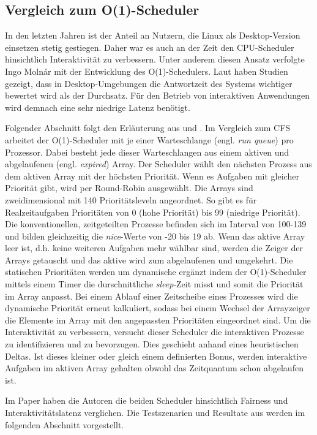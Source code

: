\subsection{Vergleich zum O(1)-Scheduler}\label{s:compO1}
In den letzten Jahren ist der Anteil an Nutzern, die Linux als Desktop-Version einsetzen stetig gestiegen. Daher war es auch an der Zeit den CPU-Scheduler hinsichtlich Interaktivität zu verbessern. Unter anderem diesen Ansatz verfolgte Ingo Molnár mit der Entwicklung des O(1)-Schedulers. Laut \cite{papercomparison} haben Studien gezeigt, dass in Desktop-Umgebungen die Antwortzeit des Systems wichtiger bewertet wird als der Durchsatz. Für den Betrieb von interaktiven Anwendungen wird demnach eine sehr niedrige Latenz benötigt. 

Folgender Abschnitt folgt den Erläuterung aus \cite{asilberschatz} und \cite{papercomparison}.
Im Vergleich zum CFS arbeitet der O(1)-Scheduler mit je einer Warteschlange (engl. \textit{run queue}) pro Prozessor. Dabei besteht jede dieser Warteschlangen aus einem aktiven und abgelaufenen (engl. \textit{expired}) Array. Der Scheduler wählt den nächsten Prozess aus dem aktiven Array mit der höchsten Priorität. Wenn es Aufgaben mit gleicher Priorität gibt, wird per Round-Robin ausgewählt. Die Arrays sind zweidimensional mit 140 Prioritätsleveln angeordnet. So gibt es für Realzeitaufgaben Prioritäten von 0 (hohe Priorität) bis 99 (niedrige Priorität). Die konventionellen, zeitgeteilten Prozesse befinden sich im Interval von 100-139 und bilden gleichzeitig die \textit{nice}-Werte von -20 bis 19 ab. Wenn das aktive Array leer ist, d.h. keine weiteren Aufgaben mehr wählbar sind, werden die Zeiger der Arrays getauscht und das aktive wird zum abgelaufenen und umgekehrt. Die statischen Prioritäten werden um dynamische ergänzt indem der O(1)-Scheduler mittels einem Timer die durschnittliche \textit{sleep}-Zeit misst und somit die Priorität im Array anpasst. Bei einem Ablauf einer Zeitscheibe eines Prozesses wird die dynamische Priorität erneut kalkuliert, sodass bei einem Wechsel der Arrayzeiger die Elemente im Array mit den angepassten Prioritäten eingeordnet sind. Um die Interaktivität zu verbessern, versucht dieser Scheduler die interaktiven Prozesse zu identifizieren und zu bevorzugen. Dies geschieht anhand eines heuristischen Deltas. Ist dieses kleiner oder gleich einem definierten Bonus, werden interaktive Aufgaben im aktiven Array gehalten obwohl das Zeitquantum schon abgelaufen ist.

Im Paper \cite{papercomparison} haben die Autoren die beiden Scheduler hinsichtlich Fairness und Interaktivitätslatenz verglichen. Die Testszenarien und  Resultate aus \cite{papercomparison} werden im folgenden Abschnitt vorgestellt.

